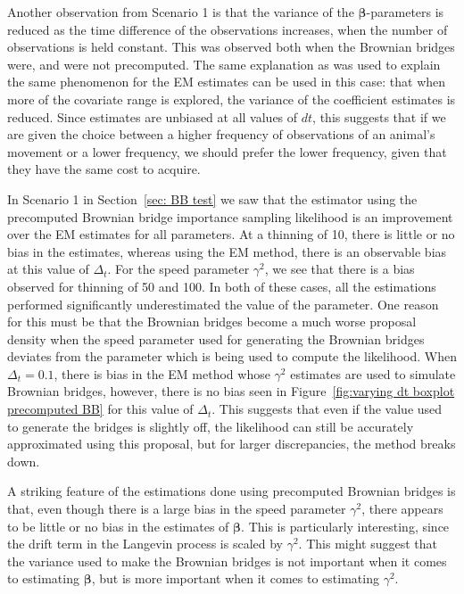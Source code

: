 Another observation from Scenario 1 is that the variance of the $\bm \beta$-parameters is reduced as the time difference of the observations increases, when the number of observations is held constant. This was observed both when the Brownian bridges were, and were not precomputed. The same explanation as was used to explain the same phenomenon for the EM estimates can be used in this case: that when more of the covariate range is explored, the variance of the coefficient estimates is reduced. Since estimates are unbiased at all values of $dt$, this suggests that if we are given the choice between a higher frequency of observations of an animal's movement or a lower frequency, we should prefer the lower frequency, given that they have the same cost to acquire.


In Scenario 1 in Section~\ref{sec: BB test} we saw that the estimator using the precomputed Brownian bridge importance sampling likelihood is an improvement over the EM estimates for all parameters. At a thinning of 10, there is little or no bias in the estimates, whereas using the EM method, there is an observable bias at this value of $\Delta_t$. For the speed parameter $\gamma^2$, we see that there is a bias observed for thinning of 50 and 100. In both of these cases, all the estimations performed significantly underestimated the value of the parameter. One reason for this must be that the Brownian bridges become a much worse proposal density when the speed parameter used for generating the Brownian bridges deviates from the parameter which is being used to compute the likelihood. 
When $\Delta_t=0.1$, there is bias in the EM method whose $\gamma^2$ estimates are used to simulate Brownian bridges, however, there is no bias seen in Figure~\ref{fig:varying dt boxplot precomputed BB} for this value of $\Delta_t$. This suggests that even if the value used to generate the bridges is slightly off, the likelihood can still be accurately approximated using this proposal, but for larger discrepancies, the method breaks down. 



A striking feature of the estimations done using precomputed Brownian bridges is that, even though there is a large bias in the speed parameter $\gamma^2$, there appears to be little or no bias in the estimates of $\bm \beta$. This is particularly interesting, since the drift term in the Langevin process is scaled by $\gamma^2$. This might suggest that the variance used to make the Brownian bridges is not important when it comes to estimating $\bm \beta$, but is more important when it comes to estimating $\gamma^2$. 




